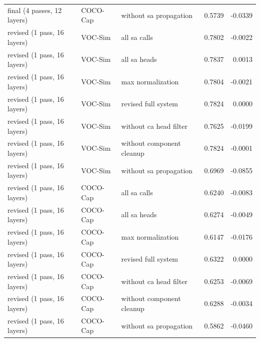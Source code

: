 {\begin{longtable}{>{\raggedright\arraybackslash}p{4.94cm}>{\raggedright\arraybackslash}p{1.92cm}>{\raggedright\arraybackslash}p{4.68cm}rr}
final (4 passes, 12 layers) & COCO-Cap & without sa propagation & 0.5739 & -0.0339 \\
revised (1 pass, 16 layers) & VOC-Sim & all sa calls & 0.7802 & -0.0022 \\
revised (1 pass, 16 layers) & VOC-Sim & all sa heads & 0.7837 & 0.0013 \\
revised (1 pass, 16 layers) & VOC-Sim & max normalization & 0.7804 & -0.0021 \\
revised (1 pass, 16 layers) & VOC-Sim & revised full system & 0.7824 & 0.0000 \\
revised (1 pass, 16 layers) & VOC-Sim & without ca head filter & 0.7625 & -0.0199 \\
revised (1 pass, 16 layers) & VOC-Sim & without component cleanup & 0.7824 & -0.0001 \\
revised (1 pass, 16 layers) & VOC-Sim & without sa propagation & 0.6969 & -0.0855 \\
revised (1 pass, 16 layers) & COCO-Cap & all sa calls & 0.6240 & -0.0083 \\
revised (1 pass, 16 layers) & COCO-Cap & all sa heads & 0.6274 & -0.0049 \\
revised (1 pass, 16 layers) & COCO-Cap & max normalization & 0.6147 & -0.0176 \\
revised (1 pass, 16 layers) & COCO-Cap & revised full system & 0.6322 & 0.0000 \\
revised (1 pass, 16 layers) & COCO-Cap & without ca head filter & 0.6253 & -0.0069 \\
revised (1 pass, 16 layers) & COCO-Cap & without component cleanup & 0.6288 & -0.0034 \\
revised (1 pass, 16 layers) & COCO-Cap & without sa propagation & 0.5862 & -0.0460 \\
\bottomrule
\end{longtable}}
